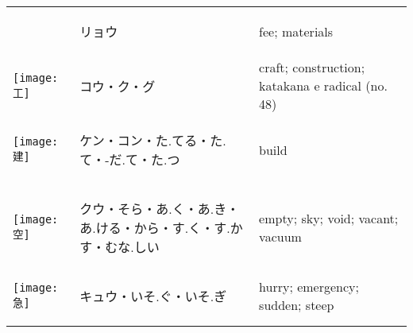 \documentclass[a4paper,12pt]{extarticle}
\begin{document}
\begin{longtable}{|lp{6cm}p{4cm}|}
\begin{minipage}{0.3\textwidth}
{}
\end{minipage}
&
\begin{CJK}{UTF8}{min}リョウ\end{CJK}
&
fee; materials
\\ 
\begin{minipage}{0.3\textwidth}
\centerline{
	\texttt{[image: 工]}
}
\end{minipage}
&
\begin{CJK}{UTF8}{min}コウ・ク・グ\end{CJK}
&
craft; construction; katakana e radical (no. 48)
\\ 
\begin{minipage}{0.3\textwidth}
\centerline{
	\texttt{[image: 建]}
}
\end{minipage}
&
\begin{CJK}{UTF8}{min}ケン・コン・た.てる・た.て・-だ.て・た.つ\end{CJK}
&
build
\\ 
\begin{minipage}{0.3\textwidth}
\centerline{
	\texttt{[image: 空]}
}
\end{minipage}
&
\begin{CJK}{UTF8}{min}クウ・そら・あ.く・あ.き・あ.ける・から・す.く・す.かす・むな.しい\end{CJK}
&
empty; sky; void; vacant; vacuum
\\ 
\begin{minipage}{0.3\textwidth}
\centerline{
	\texttt{[image: 急]}
}
\end{minipage}
&
\begin{CJK}{UTF8}{min}キュウ・いそ.ぐ・いそ.ぎ\end{CJK}
&
hurry; emergency; sudden; steep
\\ 
\begin{minipage}{0.3\textwidth}

\end{minipage}
\end{longtable}
\end{document}
